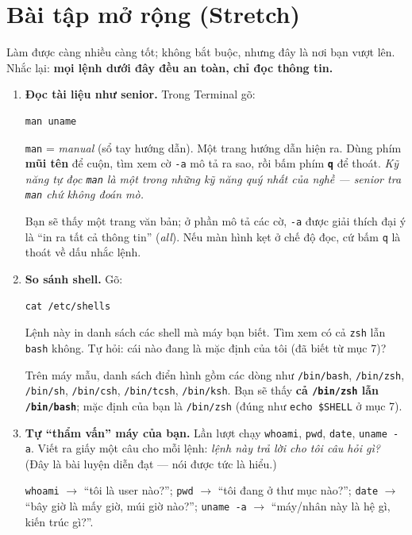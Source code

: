 \documentclass[12pt,a4paper]{article}
\begin{document}
\section{Bài tập mở rộng (Stretch)}

Làm được càng nhiều càng tốt; không bắt buộc, nhưng đây là nơi bạn vượt lên. Nhắc lại: \textbf{mọi lệnh dưới đây đều an toàn, chỉ đọc thông tin.}

\begin{enumerate}[leftmargin=*]
  \item \textbf{Đọc tài liệu như senior.} Trong Terminal gõ:
  \begin{labbox}[Lệnh]
\begin{verbatim}
man uname
\end{verbatim}
  \end{labbox}
  \texttt{man} = \textit{manual} (sổ tay hướng dẫn). Một trang hướng dẫn hiện ra. Dùng phím \textbf{mũi tên} để cuộn, tìm xem cờ \texttt{-a} mô tả ra sao, rồi bấm phím \textbf{\texttt{q}} để thoát. \textit{Kỹ năng tự đọc \texttt{man} là một trong những kỹ năng quý nhất của nghề — senior tra \texttt{man} chứ không đoán mò.}
  \begin{tipbox}
  Bạn sẽ thấy một trang văn bản; ở phần mô tả các cờ, \texttt{-a} được giải thích đại ý là ``in ra tất cả thông tin'' (\textit{all}). Nếu màn hình kẹt ở chế độ đọc, cứ bấm \texttt{q} là thoát về dấu nhắc lệnh.
  \end{tipbox}

  \item \textbf{So sánh shell.} Gõ:
  \begin{labbox}[Lệnh]
\begin{verbatim}
cat /etc/shells
\end{verbatim}
  \end{labbox}
  Lệnh này in danh sách các shell mà máy bạn biết. Tìm xem có cả \texttt{zsh} lẫn \texttt{bash} không. Tự hỏi: cái nào đang là mặc định của tôi (đã biết từ mục 7)?
  \begin{tipbox}
  Trên máy mẫu, danh sách điển hình gồm các dòng như \texttt{/bin/bash}, \texttt{/bin/zsh}, \texttt{/bin/sh}, \texttt{/bin/csh}, \texttt{/bin/tcsh}, \texttt{/bin/ksh}. Bạn sẽ thấy \textbf{cả \texttt{/bin/zsh} lẫn \texttt{/bin/bash}}; mặc định của bạn là \texttt{/bin/zsh} (đúng như \texttt{echo \$SHELL} ở mục 7).
  \end{tipbox}

  \item \textbf{Tự ``thẩm vấn'' máy của bạn.} Lần lượt chạy \texttt{whoami}, \texttt{pwd}, \texttt{date}, \texttt{uname -a}. Viết ra giấy một câu cho mỗi lệnh: \textit{lệnh này trả lời cho tôi câu hỏi gì?} (Đây là bài luyện diễn đạt — nói được tức là hiểu.)
  \begin{tipbox}
  \texttt{whoami} $\rightarrow$ ``tôi là user nào?''; \texttt{pwd} $\rightarrow$ ``tôi đang ở thư mục nào?''; \texttt{date} $\rightarrow$ ``bây giờ là mấy giờ, múi giờ nào?''; \texttt{uname -a} $\rightarrow$ ``máy/nhân này là hệ gì, kiến trúc gì?''.
  \end{tipbox}


\end{enumerate}
\end{document}
